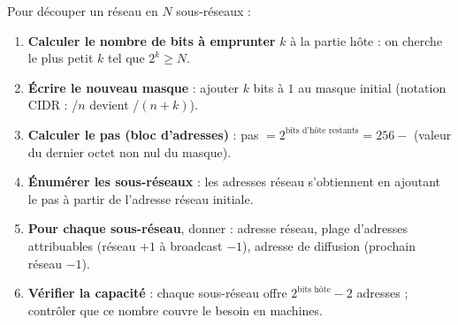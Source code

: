 \documentclass[11pt]{article}
\begin{document}
\begin{methode}
Pour découper un réseau en $N$ sous-réseaux :
\begin{enumerate}
\item \textbf{Calculer le nombre de bits à emprunter} $k$ à la partie hôte : on cherche le plus petit $k$ tel que $2^k \geq N$.
\item \textbf{Écrire le nouveau masque} : ajouter $k$ bits à $1$ au masque initial (notation CIDR : /$n$ devient /$(n+k)$).
\item \textbf{Calculer le pas (bloc d'adresses)} : pas $= 2^{\text{bits d'hôte restants}} = 256 - $ (valeur du dernier octet non nul du masque).
\item \textbf{Énumérer les sous-réseaux} : les adresses réseau s'obtiennent en ajoutant le pas à partir de l'adresse réseau initiale.
\item \textbf{Pour chaque sous-réseau}, donner : adresse réseau, plage d'adresses attribuables (réseau $+1$ à broadcast $-1$), adresse de diffusion (prochain réseau $-1$).
\item \textbf{Vérifier la capacité} : chaque sous-réseau offre $2^{\text{bits hôte}} - 2$ adresses ; contrôler que ce nombre couvre le besoin en machines.
\end{enumerate}
\end{methode}
\end{document}
